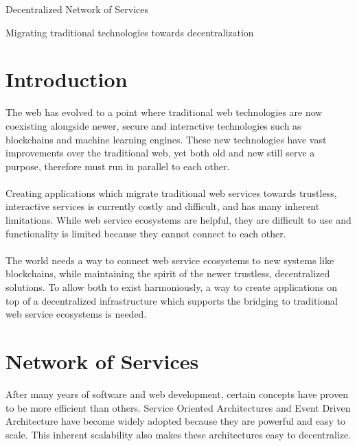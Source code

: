 \documentclass[12pt,a4paper,final]{article}
\author{Anthony Estebe}
\begin{document}
\begin{Huge}
\begin{center}
Decentralized Network of Services
\end{center}
\end{Huge}
\begin{large}
\begin{center}
Migrating traditional technologies towards decentralization
\end{center}
\end{large}

\vspace{100pt}

\section{Introduction}

The web has evolved to a point where traditional web technologies are now coexisting alongside newer, secure and interactive technologies such as blockchains and machine learning engines. These new technologies have vast improvements over the traditional web, yet both old and new still serve a purpose, therefore must run in parallel to each other. 
\\\\
Creating applications which migrate traditional web services towards trustless, interactive services is currently costly and difficult, and has many inherent limitations. While web service ecosystems are helpful, they are difficult to use and functionality is limited because they cannot connect to each other.
\\\\
The world needs a way to connect web service ecosystems to new systems like blockchains, while maintaining the spirit of the newer trustless, decentralized solutions. To allow both to exist harmoniously, a way to create applications on top of a decentralized infrastructure which supports the bridging to traditional web service ecosystems is needed.

\section{Network of Services}

After many years of software and web development, certain concepts have proven to be more efficient than others. Service Oriented Architectures and Event Driven Architecture have become widely adopted because they are powerful and easy to scale. This inherent scalability also makes these architectures easy to decentralize.
\end{document}
